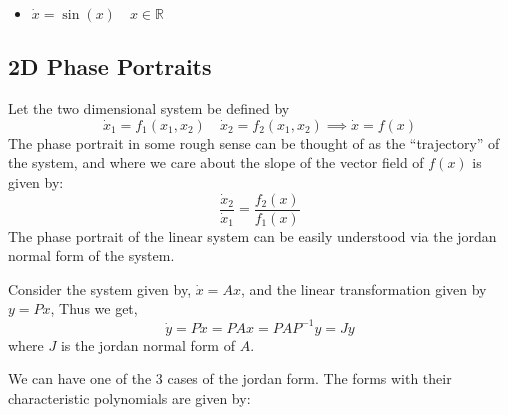 \begin{example}
\begin{itemize}
\begin{center}
        \end{center}
        \item \(\dot{x} = \sin (x) \quad x \in \mathbb{R}\)
        \begin{center}
        \end{center}
    \end{itemize}
    
\end{example}

\subsection{2D Phase Portraits}
Let the two dimensional system be defined by
\[
    \dot{x}_1 = f_1(x_1, x_2) \quad \dot{x}_2 = f_2(x_1, x_2) \implies \dot{x} = f(x)  
\]
The phase portrait in some rough sense can be thought of as the ``trajectory'' of the system,
and where we care about the slope of the vector field of \(f(x)\) is given by:
\[
    \frac{\dot{x}_2}{\dot{x}_1} = \frac{f_2(x)}{f_1(x)}  
\] 
The phase portrait of the linear system can be easily understood via the jordan normal form
of the system.

Consider the system given by, \(\dot{x} = Ax \), and the linear transformation given by \(y = Px\),
Thus we get,
\[
    \dot{y} = P\dot{x} = PAx = PAP^{-1}y = Jy  
\]  
where \(J\) is the jordan normal form of \(A\).

We can have one of the 3 cases of the jordan form. The forms with their characteristic
polynomials are given by:

